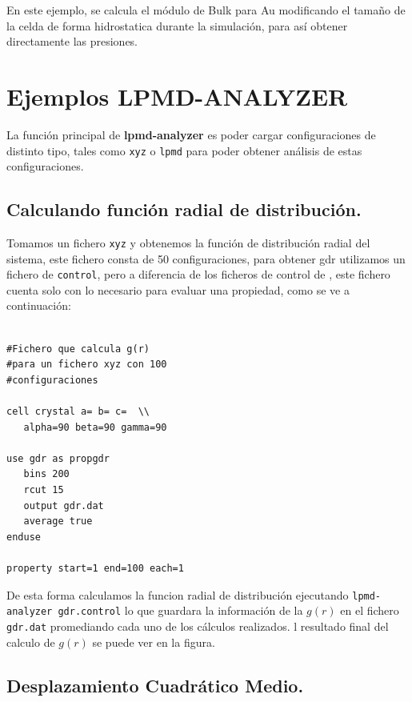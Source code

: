 En este ejemplo, se calcula el m\'odulo de Bulk para Au modificando el tama\~no de la celda de forma hidrostatica durante la simulaci\'on, para as\'i obtener directamente las presiones.

\section{Ejemplos LPMD-ANALYZER}

La funci\'on principal de \textbf{lpmd-analyzer} es poder cargar configuraciones de distinto tipo, tales como \verb|xyz| o \verb|lpmd| para poder obtener an\'alisis de estas configuraciones.

\subsection{Calculando funci\'on radial de distribuci\'on.}

Tomamos un fichero \verb|xyz| y obtenemos la funci\'on de distribuci\'on radial del sistema, este fichero consta de 50 configuraciones, para obtener gdr utilizamos un fichero de \verb|control|, pero a diferencia de los ficheros de control de \lpmd, este fichero cuenta solo con lo necesario para evaluar una propiedad, como se ve a continuaci\'on:

\begin{multicols}{2}
\setlength{\columnseprule}{.5pt}
\begin{verbatim}

#Fichero que calcula g(r)
#para un fichero xyz con 100 
#configuraciones

cell crystal a= b= c=  \\
   alpha=90 beta=90 gamma=90

use gdr as propgdr
   bins 200
   rcut 15
   output gdr.dat
   average true
enduse

property start=1 end=100 each=1
\end{verbatim}
\end{multicols}

De esta forma calculamos la funcion radial de distribuci\'on ejecutando \verb|lpmd-analyzer gdr.control| lo que guardara la informaci\'on de la $g(r)$ en el fichero \verb|gdr.dat| promediando cada uno de los c\'alculos realizados. l resultado final del calculo de $g(r)$ se puede ver en la figura.

\subsection{Desplazamiento Cuadr\'atico Medio.}

